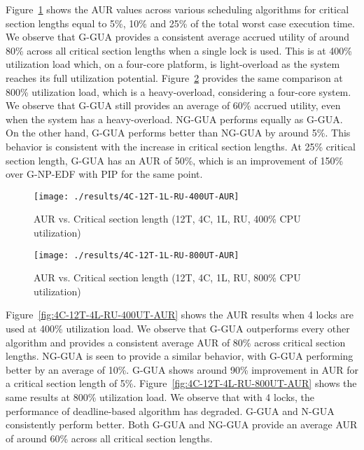 \documentclass[12pt,dvips]{report}
\begin{document}
Figure~\ref{fig:4C-12T-1L-RU-400UT-AUR} shows the AUR values across various scheduling algorithms for critical section lengths equal to 5\%, 10\% and 25\% of the total worst case execution time. We observe that G-GUA provides a consistent average accrued utility of around 80\% across all critical section lengths when a single lock is used. This is at 400\% utilization load which, on a four-core platform, is light-overload as the system reaches its full utilization potential. Figure~\ref{fig:4C-12T-1L-RU-800UT-AUR} provides the same comparison at 800\% utilization load, which is a heavy-overload, considering a four-core system. We observe that G-GUA still provides an average of 60\% accrued utility, even when the system has a heavy-overload. NG-GUA performs equally as G-GUA. On the other hand, G-GUA performs better than NG-GUA by around 5\%. This behavior is consistent with the increase in critical section lengths. At 25\% critical section length, G-GUA has an AUR of 50\%, which is an improvement of 150\% over G-NP-EDF with PIP for the same point.

\begin{figure} [htbp]
  \centering
  \texttt{[image: ./results/4C-12T-1L-RU-400UT-AUR]}
  \caption{AUR vs. Critical section length (12T, 4C, 1L, RU, 400\% CPU utilization) }
    \label{fig:4C-12T-1L-RU-400UT-AUR}
\end{figure}
 
\begin{figure} [htbp]
  \centering
  \texttt{[image: ./results/4C-12T-1L-RU-800UT-AUR]}
  \caption{AUR vs. Critical section length (12T, 4C, 1L, RU, 800\% CPU utilization) }
    \label{fig:4C-12T-1L-RU-800UT-AUR}
\end{figure}
 
Figure~\ref{fig:4C-12T-4L-RU-400UT-AUR} shows the AUR results when 4 locks are used at 400\% utilization load. We observe that G-GUA outperforms every other algorithm and provides a consistent average AUR of 80\% across critical section lengths. NG-GUA is seen to provide a similar behavior, with G-GUA performing better by an average of 10\%. G-GUA shows around 90\% improvement in AUR for a critical section length of 5\%. Figure~\ref{fig:4C-12T-4L-RU-800UT-AUR} shows the same results at 800\% utilization load. We observe that with 4 locks, the performance of deadline-based algorithm has degraded. G-GUA and N-GUA consistently perform better. Both G-GUA and NG-GUA provide an average AUR of around 60\% across all critical section lengths.
 
\end{document}
